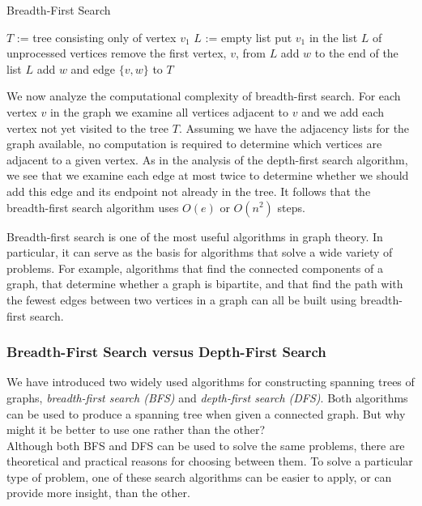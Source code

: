 \documentclass{article}
\begin{document}
\begin{algorithm}
\caption{Breadth-First Search}
\begin{algorithmic}
\State $T$ := tree consisting only of vertex $v_1$
\State $L$ := empty list
\State put $v_1$ in the list $L$ of unprocessed vertices
\State remove the first vertex, $v$, from $L$
\State add $w$ to the end of the list $L$
\State add $w$ and edge $\{v, w\}$ to $T$
\EndIf
\EndFor
\EndWhile
\EndProcedure
\end{algorithmic}
\end{algorithm}

\newpage
We now analyze the computational complexity of breadth-first search. For each vertex $v$ in the graph we examine all vertices adjacent to $v$ and we add each vertex not yet visited to the tree $T$. Assuming we have the adjacency lists for the graph available, no computation is required to determine which vertices are adjacent to a given vertex. As in the analysis of the depth-first search algorithm, we see that we examine each edge at most twice to determine whether we should add this edge and its endpoint not already in the tree. It follows that the breadth-first search algorithm uses $O(e)$ or $O(n^2)$ steps.

Breadth-first search is one of the most useful algorithms in graph theory. In particular, it can serve as the basis for algorithms that solve a wide variety of problems. For example, algorithms that find the connected components of a graph, that determine whether a graph is bipartite, and that find the path with the fewest edges between two vertices in a graph can all be built using breadth-first search.

\subsubsection{Breadth-First Search versus Depth-First Search}

We have introduced two widely used algorithms for constructing spanning trees of graphs, \textit{breadth-first search (BFS)} and \textit{depth-first search (DFS)}. Both algorithms can be used to produce a spanning tree when given a connected graph. But why might it be better to use one rather than the other?\\

Although both BFS and DFS can be used to solve the same problems, there are theoretical and practical reasons for choosing between them. To solve a particular type of problem, one of these search algorithms can be easier to apply, or can provide more insight, than the other. 
\end{document}
